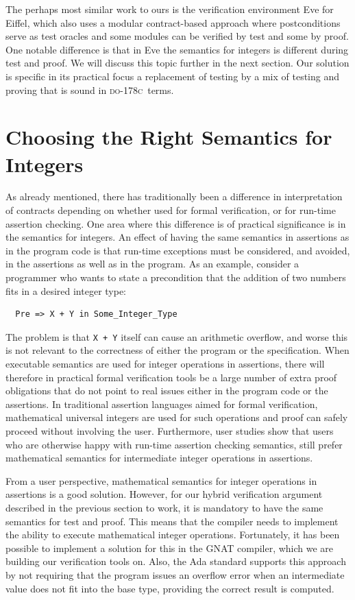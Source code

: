 \documentclass[sttt,final]{svjour}
\newcommand{\DOC}{\textsc{do-178c}}
\begin{document}
The perhaps most similar work to ours is the verification
environment Eve \cite{Tschannen:2011} for Eiffel, which also uses a
modular contract-based approach where postconditions serve as test
oracles and some modules can be verified by test and some by
proof. One notable difference is that in Eve the semantics for
integers is different during test and proof. We will discuss this
topic further in the next section. Our solution is specific in its
practical focus a replacement of testing by a mix of testing and proving
that is sound in \DOC\ terms.

\section{Choosing the Right Semantics for Integers}
\label{overflowsemantics}
As already mentioned, there has traditionally been a difference in
interpretation of contracts depending on whether used for formal
verification, or for run-time assertion checking. One area where this
difference is of practical significance is in the semantics for
integers. An effect of having the same semantics in assertions as in
the program code is that run-time exceptions must be considered, and
avoided, in the assertions as well as in the program. As an example,
consider a programmer who wants to state a precondition that the
addition of two numbers fits in a desired integer type:

\begin{lstlisting}
  Pre => X + Y in Some_Integer_Type
\end{lstlisting}

\noindent
The problem is that
\verb|X + Y| itself can cause an arithmetic overflow, and worse this
is not relevant to the correctness of either the program or the
specification. When executable semantics are used for integer
operations in assertions, there will therefore in practical formal
verification tools be a large number of extra proof obligations that do not
point to real issues either in the program code or the assertions. In
traditional assertion languages aimed for formal verification,
mathematical universal integers are used for such operations and proof
can safely proceed without involving the user. Furthermore, user
studies \cite{jotChalin04} show that users who are otherwise happy
with run-time assertion checking semantics, still prefer mathematical
semantics for intermediate integer operations in assertions.

From a user perspective, mathematical semantics for integer operations
in assertions is a good solution. However, for our hybrid verification
argument described in the previous section to work, it is mandatory to
have the same semantics for test and proof. This means that the
compiler needs to implement the ability to execute mathematical integer
operations. Fortunately, it has been possible to implement a solution
for this in the GNAT compiler, which we are building our verification
tools on. Also, the Ada standard supports this approach by not
requiring that the program issues an overflow error when an
intermediate value does not fit into the base type, providing the
correct result is computed.
\end{document}
